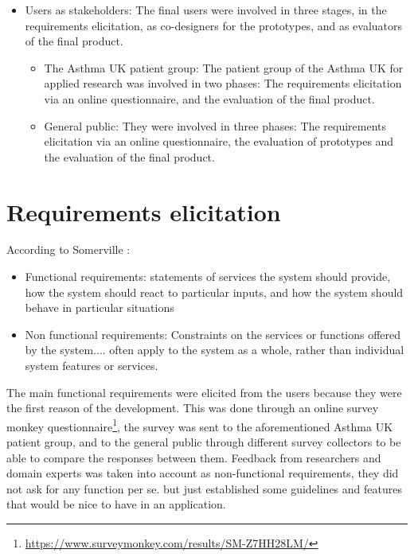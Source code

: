 \begin{itemize}
	\item Users as stakeholders: The final users were involved in three stages, in the requirements elicitation, as co-designers for the prototypes, and as evaluators  of the final product. 
    \begin{itemize}

		    \item The Asthma UK patient group: The patient group of the Asthma UK for applied research was involved in two phases: The requirements elicitation via an online questionnaire, and the evaluation of the final product.
			\item General public: They were involved in three phases: The requirements elicitation via an online questionnaire, the evaluation of  prototypes and the evaluation of the final product. 

	\end{itemize}

\end{itemize}

\section{Requirements elicitation}
According to Somerville \cite{Sommerville2010}:
\begin{displayquote}
\begin{itemize}

\item Functional requirements: statements of services the system should provide, how the system should react to particular inputs, and how the system should behave in particular situations

\item Non functional requirements: Constraints on the services or functions offered by the system.... often apply to the system as a whole, rather than individual system features or services.


\end{itemize}
\end{displayquote}

The main functional requirements were elicited from the users because they were the first reason of the development. This was done through an online survey monkey questionnaire\footnote{\url{https://www.surveymonkey.com/results/SM-Z7HH28LM/}}, the survey was sent to the aforementioned Asthma UK patient group, and to the general public through different survey collectors to be able to compare the responses between them. Feedback from researchers and domain experts was taken into account as non-functional requirements, they did not ask for any function per se. but just established some guidelines and features that would be nice to have in an application. 

